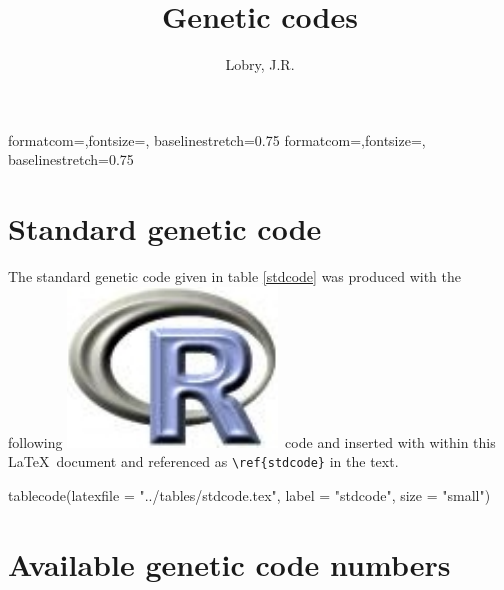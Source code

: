 \documentclass{article}
\title{Genetic codes}
\author{Lobry, J.R.}
\begin{document}
%
%
{formatcom={\color{Sinput}},fontsize=\footnotesize, baselinestretch=0.75}
{formatcom={\color{Soutput}},fontsize=\footnotesize, baselinestretch=0.75}
%
%
\renewenvironment{Schunk}{\vspace{\topsep}}{\vspace{\topsep}}
%
%
\newcommand{\Rlogo}{\protect\includegraphics[height=1.8ex,keepaspectratio]{../figs/Rlogo.pdf}}
%
%
\newcommand{\seqinr}{\texttt{seqin\bf{R}}}
\newcommand{\Seqinr}{\texttt{Seqin\bf{R}}}
%
%
%
%
%


\maketitle

\section{Standard genetic code}

The standard genetic code given in table \ref{stdcode} was produced with the
following \Rlogo{}~code and inserted with \verb||
within this \LaTeX~document and referenced as \verb|\ref{stdcode}| in
the text.

\begin{Schunk}
\begin{Sinput}
 tablecode(latexfile = "../tables/stdcode.tex", label = "stdcode", 
     size = "small")
\end{Sinput}
\end{Schunk}



\section{Available genetic code numbers}
\end{document}
